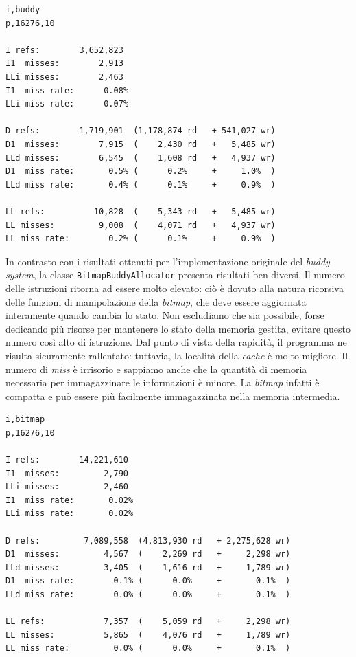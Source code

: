 \begin{lstlisting}[language={}]
i,buddy
p,16276,10

I refs:        3,652,823
I1  misses:        2,913
LLi misses:        2,463
I1  miss rate:      0.08%
LLi miss rate:      0.07%

D refs:        1,719,901  (1,178,874 rd   + 541,027 wr)
D1  misses:        7,915  (    2,430 rd   +   5,485 wr)
LLd misses:        6,545  (    1,608 rd   +   4,937 wr)
D1  miss rate:       0.5% (      0.2%     +     1.0%  )
LLd miss rate:       0.4% (      0.1%     +     0.9%  )

LL refs:          10,828  (    5,343 rd   +   5,485 wr)
LL misses:         9,008  (    4,071 rd   +   4,937 wr)
LL miss rate:        0.2% (      0.1%     +     0.9%  )
\end{lstlisting}

In contrasto con i risultati ottenuti per l'implementazione originale del \textit{buddy system}, la classe \texttt{BitmapBuddyAllocator} presenta risultati ben diversi. Il numero delle istruzioni ritorna ad essere molto elevato: ciò è dovuto alla natura ricorsiva delle funzioni di manipolazione della \textit{bitmap}, che deve essere aggiornata interamente quando cambia lo stato. Non escludiamo che sia possibile, forse dedicando più risorse per mantenere lo stato della memoria gestita, evitare questo numero così alto di istruzione. Dal punto di vista della rapidità, il programma ne risulta sicuramente rallentato: tuttavia, la località della \textit{cache} è molto migliore. Il numero di \textit{miss} è irrisorio e sappiamo anche che la quantità di memoria necessaria per immagazzinare le informazioni è minore. La \textit{bitmap} infatti è compatta e può essere più facilmente immagazzinata nella memoria intermedia. 

\begin{lstlisting}[language={}]
i,bitmap
p,16276,10

I refs:        14,221,610
I1  misses:         2,790
LLi misses:         2,460
I1  miss rate:       0.02%
LLi miss rate:       0.02%

D refs:         7,089,558  (4,813,930 rd   + 2,275,628 wr)
D1  misses:         4,567  (    2,269 rd   +     2,298 wr)
LLd misses:         3,405  (    1,616 rd   +     1,789 wr)
D1  miss rate:        0.1% (      0.0%     +       0.1%  )
LLd miss rate:        0.0% (      0.0%     +       0.1%  )

LL refs:            7,357  (    5,059 rd   +     2,298 wr)
LL misses:          5,865  (    4,076 rd   +     1,789 wr)
LL miss rate:         0.0% (      0.0%     +       0.1%  )
\end{lstlisting}

